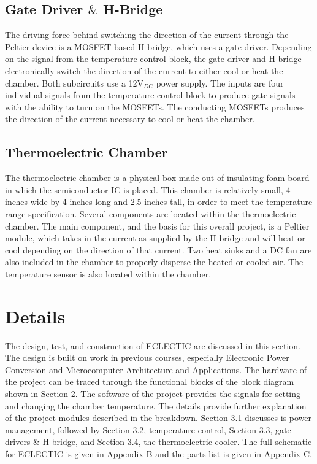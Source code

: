 \documentclass[11pt,letter]{article}
\begin{document}
\subsection{Gate Driver $\&$ H-Bridge} %

The driving force behind switching the direction of the current through the Peltier device is a MOSFET-based H-bridge, which uses a gate driver. Depending on the signal from the temperature control block, the gate driver and H-bridge electronically switch the direction of the current to either cool or heat the chamber. Both subcircuits use a 12V$_{DC}$ power supply. The inputs are four individual signals from the temperature control block to produce gate signals with the ability to turn on the MOSFETs. The conducting MOSFETs produces the direction of the current necessary to cool or heat the chamber.

\subsection{Thermoelectric Chamber} %

The thermoelectric chamber is a physical box made out of insulating foam board in which the semiconductor IC is placed. This chamber is relatively small, 4 inches wide by 4 inches long and 2.5 inches tall, in order to meet the temperature range specification. Several components are located within the thermoelectric chamber. The main component, and the basis for this overall project, is a Peltier module, which takes in the current as supplied by the H-bridge and will heat or cool depending on the direction of that current. Two heat sinks and a DC fan are also included in the chamber to properly disperse the heated or cooled air. The temperature sensor is also located within the chamber. 


\section{Details}

The design, test, and construction of ECLECTIC are discussed in this section. The design is built on work in previous courses, especially Electronic Power Conversion and Microcomputer Architecture and Applications. The hardware of the project can be traced through the functional blocks of the block diagram shown in Section 2. The software of the project provides the signals for setting and changing the chamber temperature. The details provide further explanation of the project modules described in the breakdown. Section 3.1 discusses is power management, followed by Section 3.2, temperature control, Section 3.3, gate drivers $\&$ H-bridge, and Section 3.4, the thermoelectric cooler. The full schematic for ECLECTIC is given in Appendix B and the parts list is given in Appendix C. 
\end{document}
